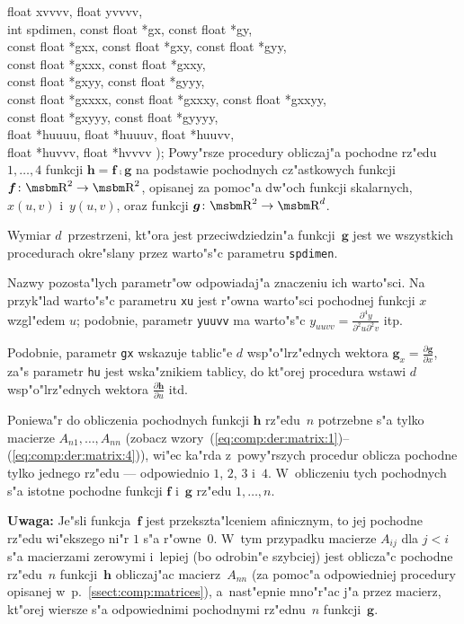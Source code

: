 {float xvvvv, float yvvvv, \\
int spdimen, const float *gx, const float *gy, \\
const float *gxx, const float *gxy, const float *gyy, \\
const float *gxxx, const float *gxxy, \\
const float *gxyy, const float *gyyy, \\
const float *gxxxx, const float *gxxxy, const float *gxxyy, \\
const float *gxyyy, const float *gyyyy, \\
float *huuuu, float *huuuv, float *huuvv, \\
float *huvvv, float *hvvvv );}
\hspace*{\parindent}
Powy"rsze procedury obliczaj"a pochodne rz"edu $1,\ldots,4$ funkcji
$\bm{h}=\bm{f}\comp\bm{g}$ na podstawie pochodnych cz"astkowych funkcji
$\bm{f}\colon\R^2\rightarrow\R^2$, opisanej za pomoc"a dw"och funkcji
skalarnych, $x(u,v)$ i~$y(u,v)$, oraz funkcji
$\bm{g}\colon\R^2\rightarrow\R^d$.

Wymiar $d$~przestrzeni, kt"ora jest przeciwdziedzin"a funkcji~$\bm{g}$
jest we wszystkich procedurach okre"slany przez warto"s"c parametru
\texttt{spdimen}.

Nazwy pozosta"lych parametr"ow odpowiadaj"a znaczeniu ich warto"sci.
Na przyk"lad warto"s"c parametru \texttt{xu} jest r"owna warto"sci pochodnej
funkcji $x$ wzgl"edem $u$; podobnie, parametr \texttt{yuuvv} ma warto"s"c
$y_{uuvv}=\frac{\partial^4 y}{\partial^2u\partial^2v}$ itp.

Podobnie, parametr \texttt{gx} wskazuje tablic"e $d$ wsp"o"lrz"ednych wektora
$\bm{g}_x=\frac{\partial\bm{g}}{\partial x}$, za"s parametr \texttt{hu} jest
wska"znikiem tablicy, do kt"orej procedura wstawi $d$ wsp"o"lrz"ednych wektora
$\frac{\partial\bm{h}}{\partial u}$ itd.

Poniewa"r do obliczenia pochodnych funkcji $\bm{h}$ rz"edu~$n$ potrzebne s"a
tylko macierze $A_{n1},\ldots,A_{nn}$ (zobacz
wzory~(\ref{eq:comp:der:matrix:1})--(\ref{eq:comp:der:matrix:4})),
wi"ec ka"rda z~powy"rszych procedur oblicza pochodne tylko jednego rz"edu ---
odpowiednio $1$, $2$, $3$ i~$4$. W~obliczeniu tych pochodnych s"a istotne
pochodne funkcji $\bm{f}$ i~$\bm{g}$ rz"edu $1,\ldots,n$.

\vspace{\medskipamount}
\noindent
\textbf{Uwaga:} Je"sli funkcja~$\bm{f}$ jest przekszta"lceniem afinicznym,
to jej pochodne rz"edu wi"ekszego ni"r $1$ s"a r"owne~$0$. W~tym przypadku
macierze $A_{ij}$ dla $j<i$ s"a macierzami zerowymi i~lepiej (bo odrobin"e
szybciej) jest oblicza"c pochodne rz"edu~$n$ funkcji~$\bm{h}$ obliczaj"ac
macierz~$A_{nn}$ (za pomoc"a odpowiedniej procedury opisanej
w~p.~\ref{ssect:comp:matrices}), a~nast"epnie mno"r"ac j"a przez macierz,
kt"orej wiersze s"a odpowiednimi pochodnymi rz"ednu~$n$ funkcji~$\bm{g}$.


